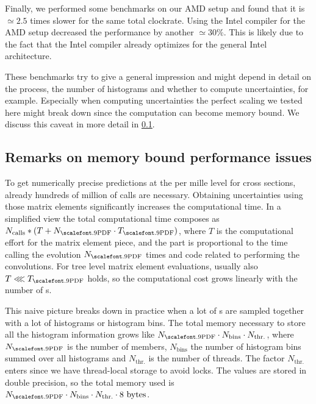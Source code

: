 Finally, we performed some benchmarks
on our AMD setup and found that it is $\simeq 2.5$ times slower for the same total clockrate. Using the Intel compiler
for the AMD setup decreased the performance by another $\simeq 30\%$. This is likely due to the fact that the Intel
compiler already optimizes for the general Intel architecture. 

These benchmarks try to give a general impression and might depend in detail on the process, the
number of histograms and whether to compute \PDF{} uncertainties, for example. Especially when computing
\PDF{} uncertainties the perfect scaling we tested here might break down since the computation can become
memory bound. We discuss this caveat in more detail in \cref{subsec:performance}.


\subsection{Remarks on memory bound performance issues}
\label{subsec:performance}
To get numerically precise predictions at the per mille level for \NNLO{} cross sections,
already hundreds of million of calls are necessary. Obtaining \PDF{} uncertainties using
those \NNLO{} matrix elements significantly increases the computational time. In a simplified view
the total computational time composes as $N_\text{calls}*(T + N_\PDF{}\cdot T_\PDF{})$, where $T$ is the
computational effort for the matrix element piece, and the \PDF{} part is proportional
to the time calling the \PDF{} evolution $N_\PDF{}$ times and code related to performing the convolutions.
For tree level matrix element evaluations, usually also $T \lll T_\PDF{}$ holds, so the computational cost
grows linearly with the number of \PDF{}s.

This naive picture breaks down in practice when a lot of \PDF{}s
are sampled together with a lot of histograms or histogram bins. The total memory necessary
to store all the histogram information grows like $N_\PDF{} \cdot N_\text{bins} \cdot N_\text{thr.}$,
where $N_\PDF{}$ is the number of \PDF{} members, $N_\text{bins}$ the number of histogram bins
summed over all histograms and $N_\text{thr.}$ is the number of \OMP{} threads. The factor $N_\text{thr.}$
enters since we have thread-local storage to avoid \OMP{} locks.
The values are stored in double precision, so the total memory used is
$N_\PDF{} \cdot N_\text{bins} \cdot N_\text{thr.} \cdot 8 \text{ bytes}$.

